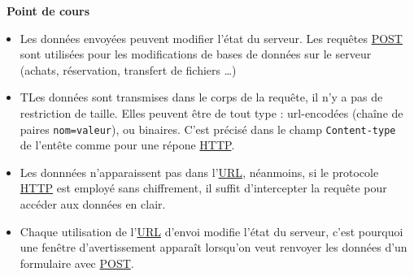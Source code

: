 \documentclass[
  11pt,
]{article}
\newcommand{\passthrough}[1]{#1}
\providecommand{\tightlist}{%
  \setlength{\itemsep}{0pt}\setlength{\parskip}{0pt}}
\newcounter{cours}
\newenvironment{cours}[1]
{\par \medskip   \addtocounter{cours}{1} \noindent  
\begin{bclogo}[arrondi =0.1,  ombre = true, barre=none, logo=\bcbook, marge=4]{~\textbf{Point de cours} \textbf{\thecours} {\itshape #1} }  \par}
{
\end{bclogo}
 \par \bigskip }
\begin{document}
\begin{cours}{}
\begin{itemize}
\tightlist
\item
  Les données envoyées peuvent modifier l'état du serveur. Les requêtes
  \href{https://developer.mozilla.org/fr/docs/Web/HTTP/M\%C3\%A9thode/POST}{POST}
  sont utilisées pour les modifications de bases de données sur le
  serveur (achats, réservation, transfert de fichiers \ldots)
\item
  TLes données sont transmises dans le corps de la requête, il n'y a pas
  de restriction de taille. Elles peuvent être de tout type :
  url-encodées (chaîne de paires \passthrough{\lstinline!nom=valeur!}),
  ou binaires. C'est précisé dans le champ
  \passthrough{\lstinline!Content-type!} de l'entête comme pour une
  répone
  \href{https://developer.mozilla.org/fr/docs/Glossaire/HTTP}{HTTP}.
\item
  Les donnnées n'apparaissent pas dans
  l'\href{https://developer.mozilla.org/fr/docs/Glossaire/URL}{URL},
  néanmoins, si le protocole
  \href{https://developer.mozilla.org/fr/docs/Glossaire/HTTP}{HTTP} est
  employé sans chiffrement, il suffit d'intercepter la requête pour
  accéder aux données en clair.
\item
  Chaque utilisation de
  l'\href{https://developer.mozilla.org/fr/docs/Glossaire/URL}{URL}
  d'envoi modifie l'état du serveur, c'est pourquoi une fenêtre
  d'avertissement apparaît lorsqu'on veut renvoyer les données d'un
  formulaire avec
  \href{https://developer.mozilla.org/fr/docs/Web/HTTP/M\%C3\%A9thode/POST}{POST}.
\end{itemize}

\end{cours}
\end{document}
